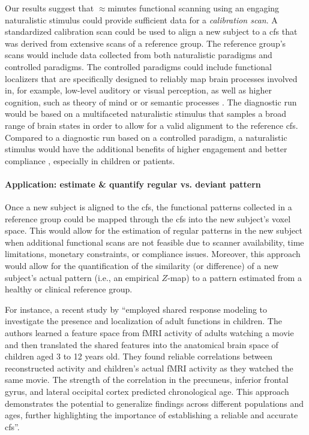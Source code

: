 %
Our results suggest that $\approx$\unit[15]{min}utes functional scanning using an engaging
naturalistic stimulus could provide sufficient data for a \textit{calibration
scan}.
%
A standardized calibration scan could be used to align a new subject to a
\ac{cfs} that was derived from extensive scans of a reference group.
%
The reference group's scans would include data collected from both naturalistic
paradigms and controlled paradigms.
%
The controlled paradigms could include functional localizers that are
specifically designed to reliably map brain processes involved in, for example,
low-level auditory or visual perception, as well as higher cognition, such as
theory of mind or \citep{spunt2014validating} or semantic processes
\citep{fedorenko2010new, fernandez2001language}.
%
The diagnostic run would be based on a multifaceted naturalistic stimulus that
samples a broad range of brain states in order to allow for a valid alignment to
the reference \ac{cfs}.
%
Compared to a diagnostic run based on a controlled paradigm, a naturalistic
stimulus would have the additional benefits of higher engagement and better
compliance \citep{vanderwal2015inscapes, eickhoff2020towards}, especially in
children or patients.


\paragraph{Application: estimate \& quantify regular vs. deviant pattern}

%
Once a new subject is aligned to the \ac{cfs}, the functional patterns collected
in a reference group could be mapped through the \ac{cfs} into the new subject's
voxel space.
%
This would allow for the estimation of regular patterns in the new subject when
additional functional scans are not feasible due to scanner availability, time
limitations, monetary constraints, or compliance issues.
%
Moreover, this approach would allow for the quantification of the similarity (or
difference) of a new subject's actual pattern (i.e., an empirical $Z$-map) to a
pattern estimated from a healthy or clinical reference group.


%
For instance, a recent study by \citet{yates2021emergence} ``employed shared
response modeling to investigate the presence and localization of adult
functions in children.
%
The authors learned a feature space from fMRI activity of adults watching a
movie and then translated the shared features into the anatomical brain space of
children aged 3 to 12 years old.
%
They found reliable correlations between reconstructed activity and children's
actual fMRI activity as they watched the same movie.
%
The strength of the correlation in the precuneus, inferior frontal gyrus, and
lateral occipital cortex predicted chronological age.
%
This approach demonstrates the potential to generalize findings across different
populations and ages, further highlighting the importance of establishing a
reliable and accurate \ac{cfs}''.



